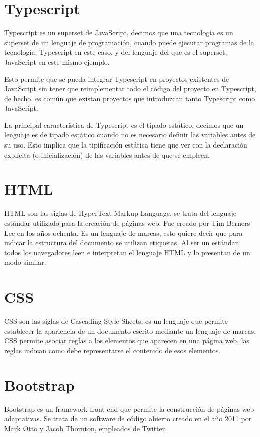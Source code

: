\documentclass[a4paper, 12pt]{book}
\begin{document}
\section{Typescript}
\label{sec:Typescript}
Typescript es un superset de JavaScript, decimos que una tecnología es un superset de un lenguaje de programación, cuando puede ejecutar programas de la tecnología, Typescript en este caso, y del lenguaje del que es el superset, JavaScript en este mismo ejemplo.

	Esto permite que se pueda integrar Typescript en proyectos existentes de JavaScript sin tener que reimplementar todo el código del proyecto en Typescript, de hecho, es común que existan proyectos que introduzcan tanto Typescript como JavaScript.
	
	La principal característica de Typescript es el tipado estático, decimos que un lenguaje es de tipado estático cuando no es necesario definir las variables antes de su uso. Esto implica que la tipificación estática tiene que ver con la declaración explícita (o inicialización) de las variables antes de que se empleen.


\section{HTML}
\label{sec:HTML}
HTML son las siglas de HyperText Markup Language, se trata del lenguaje estándar utilizado para la creación de páginas web. Fue creado por Tim Berners-Lee en los años ochenta. Es un lenguaje de marcas, esto quiere decir que para indicar la estructura del documento se utilizan etiquetas. Al ser un estándar, todos los navegadores leen e interpretan el lenguaje HTML y lo presentan de un modo similar.

\section{CSS}
\label{sec:CSS}
CSS son las siglas de Cascading Style Sheets, es un lenguaje que permite establecer la apariencia de un documento escrito mediante un lenguaje de marcas. CSS permite asociar reglas a los elementos que aparecen en una página web, las reglas indican como debe representarse el contenido de esos elementos.

\section{Bootstrap}
\label{sec:Bootstrap}
Bootstrap es un framework front-end que permite la construcción de páginas web adaptativas. Se trata de un software de código abierto creado en el año 2011 por Mark Otto y Jacob Thornton, empleados de Twitter.
\end{document}
